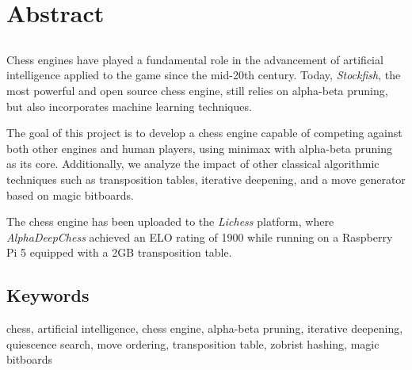 \chapter*{Abstract}

\section*{\tituloPortadaEngVal}

Chess engines have played a fundamental role in the advancement of artificial intelligence applied to the game since the mid-20th century. Today, \textit{Stockfish}, the most powerful and open source chess engine, still relies on alpha-beta pruning, but also incorporates machine learning techniques.

\vspace{1em}

\noindent The goal of this project is to develop a chess engine capable of competing against both other engines and human players, using minimax with alpha-beta pruning as its core. Additionally, we analyze the impact of other classical algorithmic techniques such as transposition tables, iterative deepening, and a move generator based on magic bitboards.

\vspace{1em}

The chess engine has been uploaded to the \textit{Lichess} platform, where \textit{AlphaDeepChess} achieved an ELO rating of 1900 while running on a Raspberry Pi 5 equipped with a 2GB transposition table.

\section*{Keywords}

\noindent chess, artificial intelligence, chess engine, alpha-beta pruning, iterative deepening, quiescence search, move ordering, transposition table, zobrist hashing, magic bitboards
